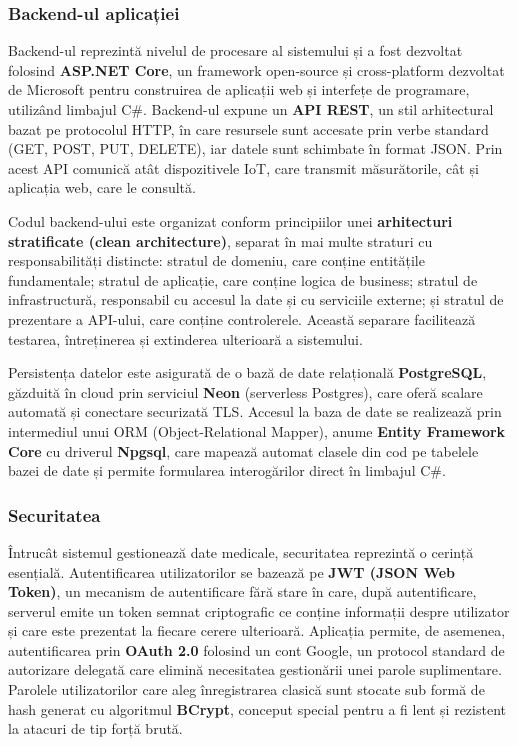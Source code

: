\documentclass[12pt,a4paper,twoside]{article}
\begin{document}
\subsubsection{Backend-ul aplicației}

Backend-ul reprezintă nivelul de procesare al sistemului și a fost dezvoltat folosind \textbf{ASP.NET Core}, un framework open-source și cross-platform dezvoltat de Microsoft pentru construirea de aplicații web și interfețe de programare, utilizând limbajul C\#. Backend-ul expune un \textbf{API REST}, un stil arhitectural bazat pe protocolul HTTP, în care resursele sunt accesate prin verbe standard (GET, POST, PUT, DELETE), iar datele sunt schimbate în format JSON. Prin acest API comunică atât dispozitivele IoT, care transmit măsurătorile, cât și aplicația web, care le consultă.

Codul backend-ului este organizat conform principiilor unei \textbf{arhitecturi stratificate (clean architecture)}, separat în mai multe straturi cu responsabilități distincte: stratul de domeniu, care conține entitățile fundamentale; stratul de aplicație, care conține logica de business; stratul de infrastructură, responsabil cu accesul la date și cu serviciile externe; și stratul de prezentare a API-ului, care conține controlerele. Această separare facilitează testarea, întreținerea și extinderea ulterioară a sistemului.

Persistența datelor este asigurată de o bază de date relațională \textbf{PostgreSQL}, găzduită în cloud prin serviciul \textbf{Neon} (serverless Postgres), care oferă scalare automată și conectare securizată TLS. Accesul la baza de date se realizează prin intermediul unui ORM (Object-Relational Mapper), anume \textbf{Entity Framework Core} cu driverul \textbf{Npgsql}, care mapează automat clasele din cod pe tabelele bazei de date și permite formularea interogărilor direct în limbajul C\#.

\subsubsection{Securitatea}

Întrucât sistemul gestionează date medicale, securitatea reprezintă o cerință esențială. Autentificarea utilizatorilor se bazează pe \textbf{JWT (JSON Web Token)}, un mecanism de autentificare fără stare în care, după autentificare, serverul emite un token semnat criptografic ce conține informații despre utilizator și care este prezentat la fiecare cerere ulterioară. Aplicația permite, de asemenea, autentificarea prin \textbf{OAuth 2.0} folosind un cont Google, un protocol standard de autorizare delegată care elimină necesitatea gestionării unei parole suplimentare. Parolele utilizatorilor care aleg înregistrarea clasică sunt stocate sub formă de hash generat cu algoritmul \textbf{BCrypt}, conceput special pentru a fi lent și rezistent la atacuri de tip forță brută.
\end{document}
